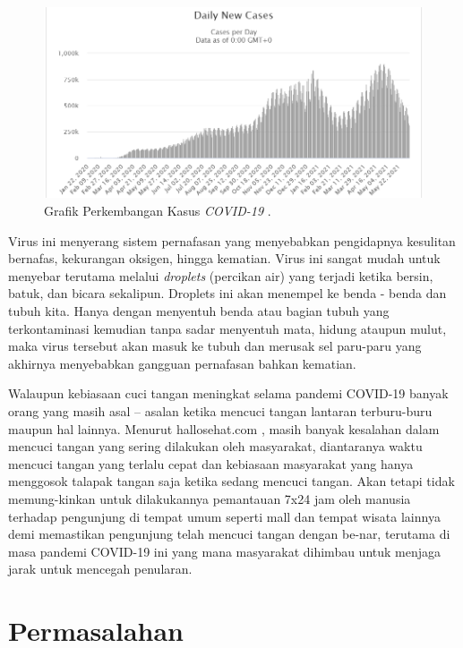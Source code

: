 \newpage
\begin{figure}[ht]
	\centering
	
	\includegraphics[width=0.9\columnwidth]{gambar/worldometer.PNG}
	
	\caption{Grafik Perkembangan Kasus \emph{COVID-19} \citep{cit:covidcase}.}
	\label{fig:covidstat}
\end{figure}

Virus ini menyerang sistem pernafasan yang menyebabkan pengidapnya kesulitan bernafas, kekurangan oksigen, hingga kematian. Virus ini sangat mudah untuk menyebar terutama melalui \emph{droplets} (percikan air) yang terjadi ketika bersin, batuk, dan bicara sekalipun. Droplets ini akan menempel ke benda - benda dan tubuh kita. Hanya dengan menyentuh benda atau bagian tubuh yang terkontaminasi kemudian tanpa sadar menyentuh mata, hidung ataupun mulut, maka virus tersebut akan masuk ke tubuh dan merusak sel paru-paru yang akhirnya menyebabkan gangguan pernafasan bahkan kematian.

Walaupun kebiasaan cuci tangan meningkat selama pandemi COVID-19 \cite{cit:cucisabun} banyak orang yang masih asal – asalan ketika mencuci tangan lantaran terburu-buru maupun hal lainnya. Menurut hallosehat.com \cite{cit:salahcuci} , masih banyak kesalahan dalam mencuci tangan yang sering dilakukan oleh masyarakat, diantaranya waktu mencuci tangan yang terlalu cepat dan kebiasaan masyarakat yang hanya menggosok talapak tangan saja ketika sedang mencuci tangan. Akan tetapi tidak memung-kinkan untuk dilakukannya pemantauan 7x24 jam oleh manusia terhadap pengunjung di tempat umum seperti mall dan tempat wisata lainnya demi memastikan pengunjung telah mencuci tangan dengan be-nar, terutama di masa pandemi COVID-19 ini yang mana masyarakat dihimbau untuk menjaga jarak untuk mencegah penularan.

\section{Permasalahan}
\label{sec:permasalahan}

